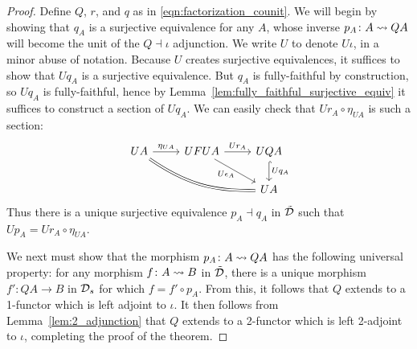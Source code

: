 \documentclass[11pt,oneside,article]{memoir}
\begin{document}
\begin{proof}
   Define $Q$, $r$, and $q$ as in \eqref{eqn:factorization_counit}. We will begin by showing that
   $q_A$ is a surjective equivalence for any $A$, whose inverse $p_A\colon A\rightsquigarrow QA$ will become the
   unit of the $Q\dashv\iota$ adjunction. We write $U$ to denote $U\iota$, in a minor abuse of
   notation. Because $U$ creates surjective equivalences, it suffices to show that $Uq_A$ is a
   surjective equivalence. But $q_A$ is fully-faithful by construction, so $Uq_A$ is fully-faithful,
   hence by Lemma~\ref{lem:fully_faithful_surjective_equiv} it suffices to construct a section of
   $Uq_A$. We can easily check that $Ur_A\circ\eta_{UA}$ is such a section:
   \begin{equation*}
      \begin{tikzcd}
         UA \ar[r,"\eta_{UA}"] \ar[rrd,bend right=18,equal]
            & UFUA \ar[r,"Ur_A"] \ar[dr,"U\epsilon_A"' inner sep=0pt]
            & UQA \ar[d,hook,"Uq_A"] \\
         && UA
      \end{tikzcd}
   \end{equation*}
   Thus there is a unique surjective equivalence $p_A\dashv q_A$ in $\tilde{\mathcal{D}}$ such that
   $Up_A= Ur_A\circ\eta_{UA}$.

   We next must show that the morphism $p_A\colon A\rightsquigarrow QA$ has the following universal property:
   for any morphism $f\colon A\rightsquigarrow B$ in $\tilde{\mathcal{D}}$, there is a unique morphism $f'\colon QA\to B$
   in $\mathcal{D}_s$ for which $f=f'\circ p_A$. From this, it follows that $Q$ extends to a 1-functor
   which is left adjoint to $\iota$. It then follows from Lemma~\ref{lem:2_adjunction} that $Q$
   extends to a 2-functor which is left 2-adjoint to $\iota$, completing the proof of the theorem. 


\end{proof}
\end{document}

